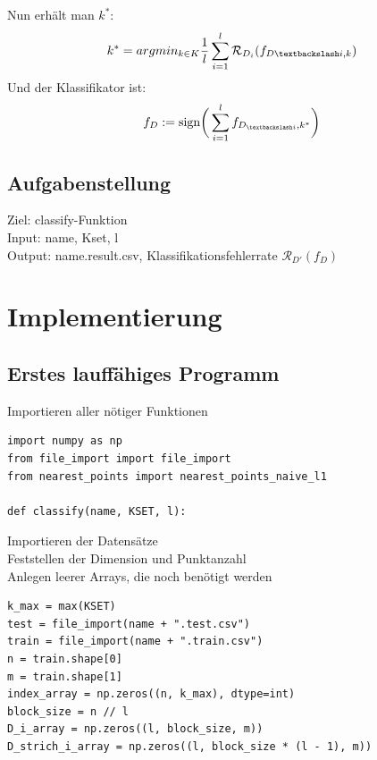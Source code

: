 \documentclass{beamer}
\begin{document}
\begin{frame}
Nun erhält man $k^*$: 
\[k^* = argmin_{k \in K} \frac{1}{l} \sum_{i=1}^l \mathcal{R}_{D_i}(f_{D \textbackslash i ,k})
\]
Und der Klassifikator ist:
\[f_ {D} := \text{sign} \bigg( \sum_{i=1}^{l} f_{D_{\textbackslash i}, k^{*}}\bigg)
\]
\end{frame}

\subsection{Aufgabenstellung}
\begin{frame}
Ziel: classify-Funktion\\
Input: name, Kset, l \\
Output: name.result.csv, Klassifikationsfehlerrate $\mathcal{R}_{D'}(f_{D})$ \\
\vspace{20 mm}
\end{frame}



\section{Implementierung}




\subsection{Erstes lauffähiges Programm}

\begin{frame}[fragile]
Importieren aller nötiger Funktionen
\begin{verbatim}
import numpy as np
from file_import import file_import
from nearest_points import nearest_points_naive_l1

def classify(name, KSET, l):
\end{verbatim}
\end{frame}

\begin{frame}[fragile]
Importieren der Datensätze\\
Feststellen der Dimension und Punktanzahl\\
Anlegen leerer Arrays, die noch benötigt werden\\
\begin{verbatim}
k_max = max(KSET)
test = file_import(name + ".test.csv")  
train = file_import(name + ".train.csv")  
n = train.shape[0]  
m = train.shape[1] 
index_array = np.zeros((n, k_max), dtype=int)  
block_size = n // l  
D_i_array = np.zeros((l, block_size, m))  
D_strich_i_array = np.zeros((l, block_size * (l - 1), m))  
\end{verbatim}
\end{frame}
\end{document}

